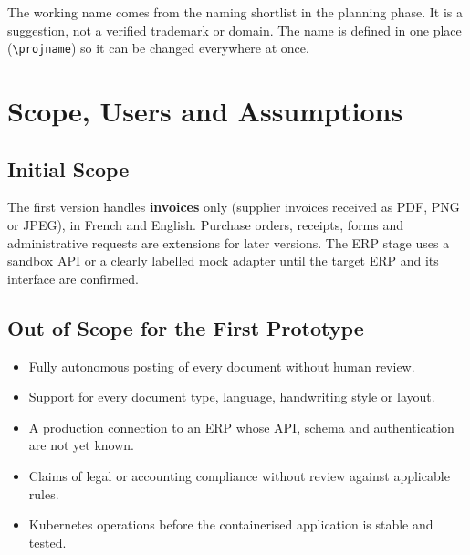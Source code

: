 \begin{infobox}
The working name \projname{} comes from the naming shortlist in the planning phase. It is a suggestion, not a verified trademark or domain. The name is defined in one place (\texttt{\textbackslash projname}) so it can be changed everywhere at once.
\end{infobox}

\chapter{Scope, Users and Assumptions}
\section{Initial Scope}
The first version handles \textbf{invoices} only (supplier invoices received as PDF, PNG or JPEG), in French and English. Purchase orders, receipts, forms and administrative requests are extensions for later versions. The ERP stage uses a sandbox API or a clearly labelled mock adapter until the target ERP and its interface are confirmed.

\section{Out of Scope for the First Prototype}
\begin{itemize}
\item Fully autonomous posting of every document without human review.
\item Support for every document type, language, handwriting style or layout.
\item A production connection to an ERP whose API, schema and authentication are not yet known.
\item Claims of legal or accounting compliance without review against applicable rules.
\item Kubernetes operations before the containerised application is stable and tested.
\end{itemize}

